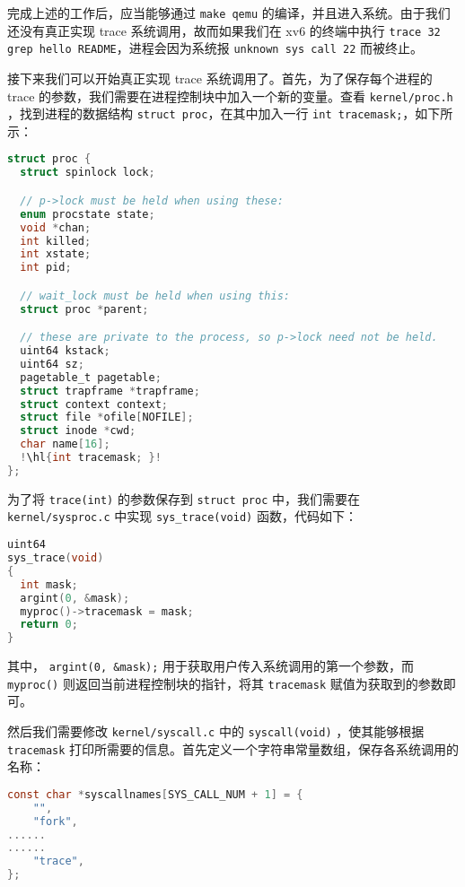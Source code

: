 完成上述的工作后，应当能够通过 \lstinline{make qemu} 的编译，并且进入系统。由于我们还没有真正实现 trace 系统调用，故而如果我们在 xv6 的终端中执行 \lstinline{trace 32 grep hello README}，进程会因为系统报 \lstinline{unknown sys call 22} 而被终止。

接下来我们可以开始真正实现 trace 系统调用了。首先，为了保存每个进程的 trace 的参数，我们需要在进程控制块中加入一个新的变量。查看 \lstinline{kernel/proc.h} ，找到进程的数据结构 \lstinline{struct proc}，在其中加入一行 \lstinline{int tracemask;}，如下所示：
\begin{lstlisting}[language=C,escapechar={!}]
struct proc {
  struct spinlock lock;

  // p->lock must be held when using these:
  enum procstate state;        
  void *chan;                  
  int killed;                  
  int xstate;                  
  int pid;                     

  // wait_lock must be held when using this:
  struct proc *parent;         

  // these are private to the process, so p->lock need not be held.
  uint64 kstack;               
  uint64 sz;                   
  pagetable_t pagetable;       
  struct trapframe *trapframe; 
  struct context context;      
  struct file *ofile[NOFILE];  
  struct inode *cwd;           
  char name[16];               
  !\hl{int tracemask; }!
};
\end{lstlisting}

为了将 \lstinline{trace(int)} 的参数保存到 \lstinline{struct proc} 中，我们需要在 \lstinline{kernel/sysproc.c} 中实现 \lstinline{sys_trace(void)} 函数，代码如下：

\begin{lstlisting}[language=C,escapechar={!}]
uint64
sys_trace(void)
{
  int mask;
  argint(0, &mask);
  myproc()->tracemask = mask;
  return 0;
}
\end{lstlisting}

其中， \lstinline{argint(0, &mask);} 用于获取用户传入系统调用的第一个参数，而 \lstinline{myproc()} 则返回当前进程控制块的指针，将其 \lstinline{tracemask} 赋值为获取到的参数即可。

然后我们需要修改 \lstinline{kernel/syscall.c} 中的 \lstinline{syscall(void)} ，使其能够根据 \lstinline{tracemask} 打印所需要的信息。首先定义一个字符串常量数组，保存各系统调用的名称：
\begin{lstlisting}[language=C,escapechar={!}]
const char *syscallnames[SYS_CALL_NUM + 1] = {
    "",
    "fork",
......
......
    "trace",
};
\end{lstlisting}


